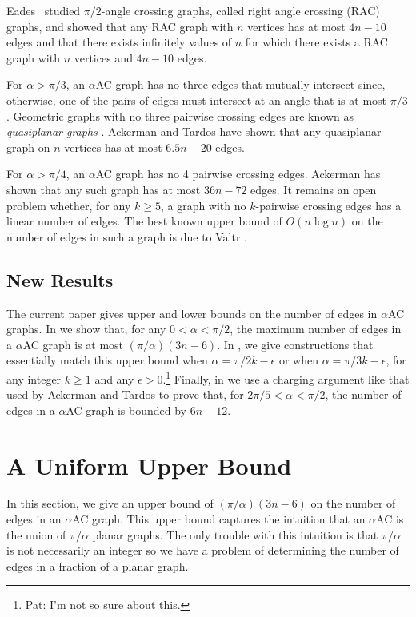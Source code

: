\documentclass[lotsofwhite,charterfonts]{patmorin}
\begin{document}
Eades \etal\ studied $\pi/2$-angle crossing graphs, called right angle
crossing (RAC) graphs, and showed that any RAC graph with $n$ vertices has
at most $4n-10$ edges and that there exists infinitely values of $n$ for
which there exists a RAC graph with $n$ vertices and $4n-10$ edges. 

For $\alpha > \pi/3$, an $\alpha$AC graph has no three edges that
mutually intersect since, otherwise, one of the pairs of edges must
intersect at an angle that is at most $\pi/3$.  Geometric graphs with no
three pairwise crossing edges are known as \emph{quasiplanar graphs}
\cite{aapps97}. Ackerman and Tardos \cite[Theorem~5]{atXX} have shown that
any quasiplanar graph on $n$ vertices has at most $6.5n - 20$ edges. 

For $\alpha > \pi/4$, an $\alpha$AC graph has no 4 pairwise crossing edges.
Ackerman has shown that any such graph has at most $36n - 72$ edges.  It
remains an open problem whether, for any $k\ge 5$, a graph with no
$k$-pairwise crossing edges has a linear number of edges.  The best known
upper bound of $O(n\log n)$ on the number of edges in such a graph is due
to Valtr \cite[Theorem~3]{v99}.

\subsection{New Results}

The current paper gives upper and lower bounds on the number of edges in
$\alpha$AC graphs.  In  we show that, for any $0< \alpha
<\pi/2$, the maximum number of edges in a $\alpha$AC graph is at most
$(\pi/\alpha)(3n-6)$.  In , we give constructions that
essentially match this upper bound when $\alpha = \pi/2k-\epsilon$ or when
$\alpha = \pi/ 3k-\epsilon$, for any integer $k \ge 1$ and any $\epsilon >
0$.\footnote{Pat: I'm not so sure about this.}  Finally, in
 we use a charging argument like that used by Ackerman and
Tardos to prove that, for $2\pi/5 < \alpha < \pi/2$, the number of edges in
a $\alpha$AC graph is bounded by $6n-12$.


\section{A Uniform Upper Bound}

In this section, we give an upper bound of $(\pi/\alpha)(3n-6)$ on the
number of edges in an $\alpha$AC graph.  This upper bound captures the
intuition that an $\alpha$AC is the union of $\pi/\alpha$ planar graphs.
The only trouble with this intuition is that $\pi/\alpha$ is not
necessarily an integer so we have a problem of determining the number of
edges in a fraction of a planar graph.
\end{document}
